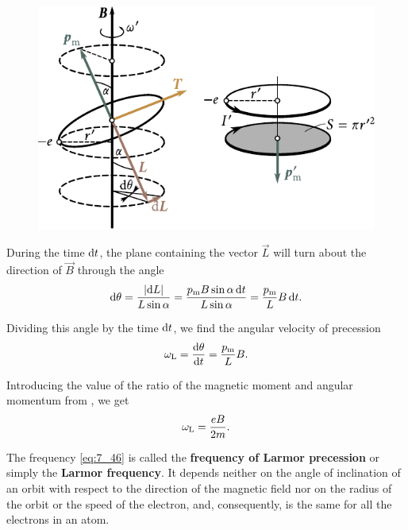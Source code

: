 \begin{figure}[t]
	\begin{center}
		\includegraphics[scale=1]{figures/ch_07/fig_7_14.pdf}
		\caption[]{}
		\label{fig:7_14}
	\end{center}
	\vspace{-0.8cm}
\end{figure}

During the time $\mathrm{d} t$, the plane containing the vector $\vec{L}$ will turn about the direction of $\vec{B}$ through the angle
\begin{equation*}
    \mathrm{d}\theta = \frac{|\mathrm{d} L|}{L\sin\alpha} = \frac{p_{\text{m}}B\sin\alpha\, \mathrm{d} t}{L\sin\alpha} = \frac{p_{\text{m}}}{L} B\, \mathrm{d} t.
\end{equation*}

\noindent
Dividing this angle by the time $\mathrm{d} t$, we find the angular velocity of precession
\begin{equation*}
    \omega_{\text{L}} = \dfrac{\mathrm{d}\theta}{\mathrm{d} t} = \frac{p_{\text{m}}}{L} B.
\end{equation*}

\noindent
Introducing the value of the ratio of the magnetic moment and angular momentum from , we get
\begin{equation}\label{eq:7_46}
    \omega_{\text{L}} = \frac{eB}{2m}.
\end{equation}

The frequency \eqref{eq:7_46} is called the \textbf{frequency of Larmor precession}
or simply the \textbf{Larmor frequency}.
It depends neither on the angle of inclination of an orbit with respect to the direction of the magnetic field nor on the radius of the orbit or the speed of the electron, and, consequently, is the same for all the electrons in an atom.

